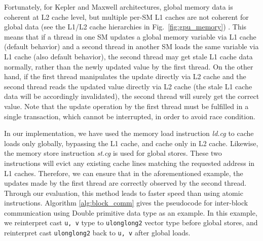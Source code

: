 \documentclass[article]{elsarticle}
\begin{document}
{\begin{algorithm}[!h]
\begin{algorithmic}[1]
    
\EndProcedure
\end{algorithmic}

\begin{algorithmic}[1]
 \If {}
 
    \EndWhile
 \EndIf
 \If{}
 
 \EndIf
 
 
 \Return {;}
\EndFunction
\end{algorithmic}

\end{algorithm}

Fortunately, for Kepler and Maxwell architectures, global memory data is coherent at L2 cache level, but multiple per-SM L1 caches are not coherent for global data (see the L1/L2 cache hierarchies in Fig.~\ref{fig:gpu_memory}) \cite{ptxisa43}. This means that if a thread in one SM updates a global memory variable via L1 cache (default behavior) and a second thread in another SM loads the same variable via L1 cache (also default behavior), the second thread may get stale L1 cache data normally, rather than the newly updated value by the first thread. On the other hand, if the first thread manipulates the update directly via L2 cache and the second thread reads the updated value directly via L2 cache (the stale L1 cache data will be accordingly invalidated), the second thread will surely get the correct value. Note that the update operation by the first thread must be fulfilled in a single transaction, which cannot be interrupted, in order to avoid race condition.

In our implementation, we have used the memory load instruction \textit{ld.cg} to cache loads only globally, bypassing the L1 cache, and cache only in L2 cache. Likewise, the memory store instruction \textit{st.cg} is used for global stores. These two instructions will evict any existing cache lines matching the requested address in L1 caches. Therefore, we can ensure that in the aforementioned example, the updates made by the first thread are correctly observed by the second thread. Through our evaluation, this method leads to faster speed than using atomic instructions. Algorithm \ref{alg:block_comm} gives the pseudocode for inter-block communication using Double primitive data type as an example. In this example, we reinterpret cast \hbox{{\tt u, v}} type to {\tt ulonglong2} vector type before global stores, and reinterpret cast {\tt ulonglong2} back to \hbox{{\tt u, v}} after global loads.

}
\end{document}
